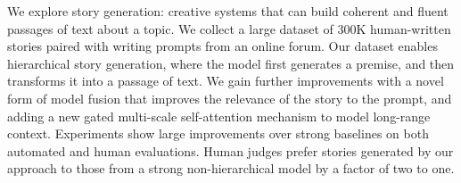 We explore story generation: creative systems that can build coherent and fluent passages of text about a topic. We collect a large dataset of 300K human-written stories paired with writing prompts from an online forum. Our dataset enables hierarchical story generation, where the model first generates a premise, and then transforms it into a passage of text. We gain further improvements with a novel form of model fusion that improves the relevance of the story to the prompt, and adding a new gated multi-scale self-attention mechanism to model long-range context. Experiments show large improvements over strong baselines on both automated and human evaluations. Human judges prefer stories generated by our approach to those from a strong non-hierarchical model by a factor of two to one.
